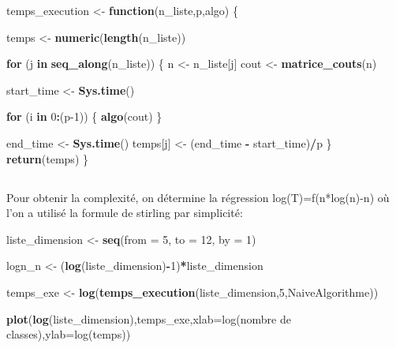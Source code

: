 \documentclass[
]{article}
\newenvironment{Shaded}{\begin{snugshade}}{\end{snugshade}}
\newcommand{\AttributeTok}[1]{\textcolor[rgb]{0.13,0.29,0.53}{#1}}
\newcommand{\ControlFlowTok}[1]{\textcolor[rgb]{0.13,0.29,0.53}{\textbf{#1}}}
\newcommand{\DecValTok}[1]{\textcolor[rgb]{0.00,0.00,0.81}{#1}}
\newcommand{\FunctionTok}[1]{\textcolor[rgb]{0.13,0.29,0.53}{\textbf{#1}}}
\newcommand{\NormalTok}[1]{#1}
\newcommand{\OtherTok}[1]{\textcolor[rgb]{0.56,0.35,0.01}{#1}}
\newcommand{\SpecialCharTok}[1]{\textcolor[rgb]{0.81,0.36,0.00}{\textbf{#1}}}
\newcommand{\StringTok}[1]{\textcolor[rgb]{0.31,0.60,0.02}{#1}}
\begin{document}
\begin{Shaded}
\begin{Highlighting}[]
\NormalTok{temps\_execution }\OtherTok{\textless{}{-}} \ControlFlowTok{function}\NormalTok{(n\_liste,p,algo) \{}

\NormalTok{  temps }\OtherTok{\textless{}{-}} \FunctionTok{numeric}\NormalTok{(}\FunctionTok{length}\NormalTok{(n\_liste))}
  
  \ControlFlowTok{for}\NormalTok{ (j }\ControlFlowTok{in} \FunctionTok{seq\_along}\NormalTok{(n\_liste)) \{}
\NormalTok{    n }\OtherTok{\textless{}{-}}\NormalTok{ n\_liste[j]}
\NormalTok{    cout }\OtherTok{\textless{}{-}} \FunctionTok{matrice\_couts}\NormalTok{(n)}
    
\NormalTok{    start\_time }\OtherTok{\textless{}{-}} \FunctionTok{Sys.time}\NormalTok{()}
    
    \ControlFlowTok{for}\NormalTok{ (i }\ControlFlowTok{in} \DecValTok{0}\SpecialCharTok{:}\NormalTok{(p}\DecValTok{{-}1}\NormalTok{)) \{}
    \FunctionTok{algo}\NormalTok{(cout)}
\NormalTok{    \}}
    
\NormalTok{    end\_time }\OtherTok{\textless{}{-}} \FunctionTok{Sys.time}\NormalTok{()}
\NormalTok{    temps[j] }\OtherTok{\textless{}{-}}\NormalTok{ (end\_time }\SpecialCharTok{{-}}\NormalTok{ start\_time)}\SpecialCharTok{/}\NormalTok{p}
\NormalTok{  \}}
  \FunctionTok{return}\NormalTok{(temps)}
\NormalTok{\}}
\end{Highlighting}
\end{Shaded}

\hypertarget{section-12}{%
\subsection{}\label{section-12}}

Pour obtenir la complexité, on détermine la régression
log(T)=f(n*log(n)-n) où l'on a utilisé la formule de stirling par
simplicité:

\begin{Shaded}
\begin{Highlighting}[]
\NormalTok{liste\_dimension }\OtherTok{\textless{}{-}} \FunctionTok{seq}\NormalTok{(}\AttributeTok{from =} \DecValTok{5}\NormalTok{, }\AttributeTok{to =} \DecValTok{12}\NormalTok{, }\AttributeTok{by =} \DecValTok{1}\NormalTok{)}

\NormalTok{logn\_n }\OtherTok{\textless{}{-}}\NormalTok{ (}\FunctionTok{log}\NormalTok{(liste\_dimension)}\SpecialCharTok{{-}}\DecValTok{1}\NormalTok{)}\SpecialCharTok{*}\NormalTok{liste\_dimension}

\NormalTok{temps\_exe }\OtherTok{\textless{}{-}} \FunctionTok{log}\NormalTok{(}\FunctionTok{temps\_execution}\NormalTok{(liste\_dimension,}\DecValTok{5}\NormalTok{,NaiveAlgorithme)) }

\FunctionTok{plot}\NormalTok{(}\FunctionTok{log}\NormalTok{(liste\_dimension),temps\_exe,}\AttributeTok{xlab=}\StringTok{\textquotesingle{}log(nombre de classes)\textquotesingle{}}\NormalTok{,}\AttributeTok{ylab=}\StringTok{\textquotesingle{}log(temps)\textquotesingle{}}\NormalTok{)}
\end{Highlighting}
\end{Shaded}
\end{document}
